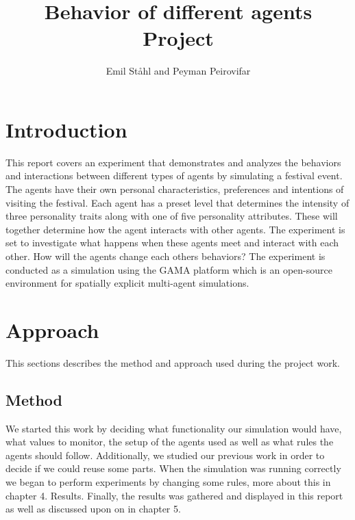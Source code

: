 \documentclass[a4paper,10pt]{article}
\title{\textbf{Behavior of different agents} \\ 
\textbf{Project}}
\author{Emil Ståhl and Peyman Peirovifar}
\begin{document}
\maketitle

\section{Introduction}
This report covers an experiment that demonstrates and analyzes the behaviors and interactions between different types of 
agents by simulating a festival event. The agents have their own personal characteristics, preferences and intentions of 
visiting the festival. Each agent has a preset level that determines the intensity of three personality traits along with one of five personality attributes. These will together determine how the agent interacts with other agents.
The experiment is set to investigate what happens when these agents meet and interact with each other. How will the agents change each others behaviors? The experiment is conducted as a simulation using the GAMA platform which is an open-source environment for spatially explicit multi-agent simulations. 


\maketitle
\section{Approach}
This sections describes the method and approach used during the project work.

\subsection{Method}
We started this work by deciding what functionality our simulation would have, what values to monitor, the setup of the agents used as well as what rules the agents should follow. Additionally, we studied our previous work in order to decide if we could reuse some parts. When the simulation was running correctly we began to perform experiments by changing some rules, more about this in chapter 4. Results. Finally, the results was gathered and displayed in this report as well as discussed upon on in chapter 5. 

\maketitle
\end{document}
